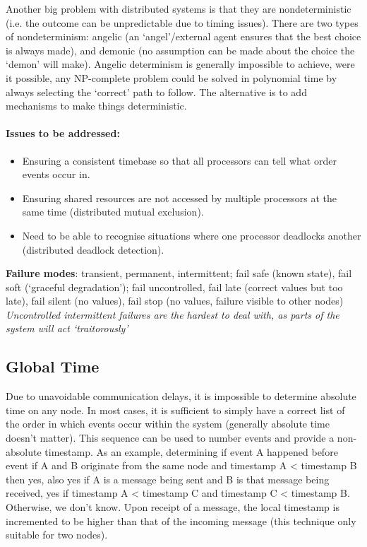 \documentclass[a4paper,oneside]{report}
\begin{document}
	Another big problem with distributed systems is that they are nondeterministic (i.e. the outcome can be unpredictable due to timing issues). There are two types of nondeterminism: angelic (an ‘angel’/external agent ensures that the best choice is always made), and demonic (no assumption can be made about the choice the ‘demon’ will make). Angelic determinism is generally impossible to achieve, were it possible, any NP-complete problem could be solved in polynomial time by always selecting the ‘correct’ path to follow. The alternative is to add mechanisms to make things deterministic.   
   	
   		\paragraph{Issues to be addressed:}
		\begin{itemize}
			\item Ensuring a consistent timebase so that all processors can tell what order events occur in.
			\item Ensuring shared resources are not accessed by multiple processors at the same time (distributed mutual exclusion).
			\item Need to be able to recognise situations where one processor deadlocks another (distributed deadlock detection).
		\end{itemize}
   	
   	\textbf{Failure modes}: transient, permanent, intermittent; fail safe (known state), fail soft (‘graceful degradation’); fail uncontrolled, fail late (correct values but too late), fail silent (no values), fail stop (no values, failure visible to other nodes)
   	\emph{Uncontrolled intermittent failures are the hardest to deal with, as parts of the system will act `traitorously'}

		\subsection{Global Time}
   	
   		Due to unavoidable communication delays, it is impossible to determine absolute time on any node. In most cases, it is sufficient to simply have a correct list of the order in which events occur within the system (generally absolute time doesn't matter). This sequence can be used to number events and provide a non-absolute timestamp. As an example, determining if event A happened before event if A and B originate from the same node and timestamp A < timestamp B then yes, also yes if A is a message being sent and B is that message being received, yes if timestamp A < timestamp C and timestamp C < timestamp B. Otherwise, we don’t know. Upon receipt of a message, the local timestamp is incremented to be higher than that of the incoming message (this technique only suitable for two nodes). 
   
\end{document}
